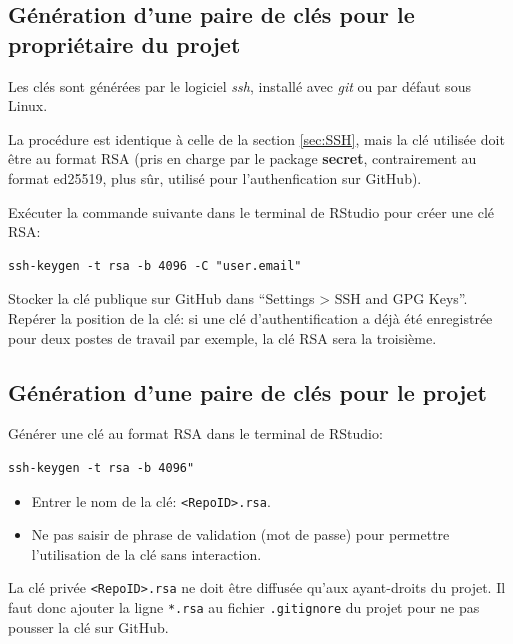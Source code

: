 \documentclass[
  12pt,
  french,
  a4paper,
  extrafontsizes,onecolumn,openright
  ]{memoir}
\providecommand{\tightlist}{%
  \setlength{\itemsep}{0pt}\setlength{\parskip}{0pt}}
\begin{document}
\subsection{Génération d'une paire de clés pour le propriétaire du projet}\label{guxe9nuxe9ration-dune-paire-de-cluxe9s-pour-le-propriuxe9taire-du-projet}

Les clés sont générées par le logiciel \emph{ssh}, installé avec \emph{git} ou par défaut sous Linux.

La procédure est identique à celle de la section \ref{sec:SSH}, mais la clé utilisée doit être au format RSA (pris en charge par le package \textbf{secret}, contrairement au format ed25519, plus sûr, utilisé pour l'authenfication sur GitHub).

Exécuter la commande suivante dans le terminal de RStudio pour créer une clé RSA:

\begin{verbatim}
ssh-keygen -t rsa -b 4096 -C "user.email"
\end{verbatim}

Stocker la clé publique sur GitHub dans \enquote{Settings \textgreater{} SSH and GPG Keys}.
Repérer la position de la clé: si une clé d'authentification a déjà été enregistrée pour deux postes de travail par exemple, la clé RSA sera la troisième.

\subsection{Génération d'une paire de clés pour le projet}\label{guxe9nuxe9ration-dune-paire-de-cluxe9s-pour-le-projet}

Générer une clé au format RSA dans le terminal de RStudio:

\begin{verbatim}
ssh-keygen -t rsa -b 4096" 
\end{verbatim}

\begin{itemize}
\tightlist
\item
  Entrer le nom de la clé: \texttt{\textless{}RepoID\textgreater{}.rsa}.
\item
  Ne pas saisir de phrase de validation (mot de passe) pour permettre l'utilisation de la clé sans interaction.
\end{itemize}

La clé privée \texttt{\textless{}RepoID\textgreater{}.rsa} ne doit être diffusée qu'aux ayant-droits du projet.
Il faut donc ajouter la ligne \texttt{*.rsa} au fichier \texttt{.gitignore} du projet pour ne pas pousser la clé sur GitHub.
\end{document}
